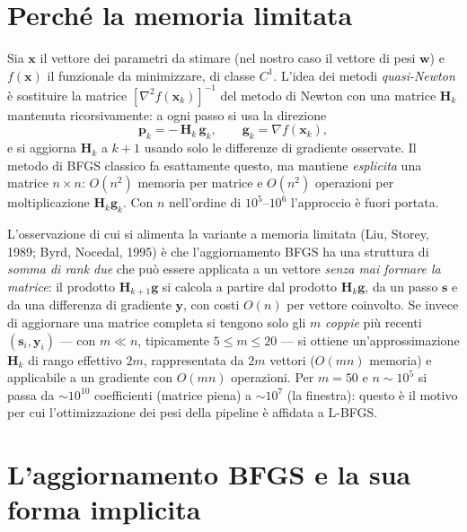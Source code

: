 \section{Perché la memoria limitata}

Sia $\bm{x}$ il vettore dei parametri da stimare (nel nostro caso il vettore
di pesi $\bm{w}$) e $f(\bm{x})$ il funzionale da minimizzare, di classe
$C^1$. L'idea dei metodi \emph{quasi-Newton} è sostituire la matrice
$[\nabla^2 f(\bm{x}_k)]^{-1}$ del metodo di Newton con una matrice
$\bm{H}_k$ mantenuta ricorsivamente: a ogni passo si usa la direzione
\begin{equation}
\label{eq:quasi-newton-direction}
\bm{p}_k = -\,\bm{H}_k\,\bm{g}_k,
\qquad
\bm{g}_k = \nabla f(\bm{x}_k),
\end{equation}
e si aggiorna $\bm{H}_k$ a $k{+}1$ usando solo le differenze di gradiente
osservate. Il metodo di BFGS classico fa esattamente questo, ma mantiene
\emph{esplicita} una matrice $n\times n$: $O(n^2)$ memoria per matrice e
$O(n^2)$ operazioni per moltiplicazione $\bm{H}_k\bm{g}_k$. Con $n$ nell'ordine
di $10^5$--$10^6$ l'approccio è fuori portata.

L'osservazione di cui si alimenta la variante a memoria limitata (Liu,
Storey, 1989; Byrd, Nocedal, 1995) è che l'aggiornamento BFGS ha una
struttura di \emph{somma di rank due} che può essere applicata a un vettore
\emph{senza mai formare la matrice}: il prodotto $\bm{H}_{k+1}\bm{g}$ si
calcola a partire dal prodotto $\bm{H}_k\bm{g}$, da un passo $\bm{s}$ e da una
differenza di gradiente $\bm{y}$, con costi $O(n)$ per vettore coinvolto. Se
invece di aggiornare una matrice completa si tengono solo gli $m$ \emph{coppie}
più recenti $(\bm{s}_i,\bm{y}_i)$ — con $m \ll n$, tipicamente $5 \le m \le 20$
— si ottiene un'approssimazione $\bm{H}_k$ di rango effettivo $2m$, rappresentata
da $2m$ vettori ($O(mn)$ memoria) e applicabile a un gradiente con $O(mn)$
operazioni. Per $m=50$ e $n \sim 10^5$ si passa da $\sim 10^{10}$ coefficienti
(matrice piena) a $\sim 10^{7}$ (la finestra): questo è il motivo per cui
l'ottimizzazione dei pesi della pipeline è affidata a L-BFGS.

\section{L'aggiornamento BFGS e la sua forma implicita}

